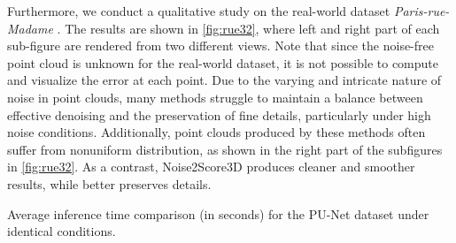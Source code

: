 Furthermore, we conduct a qualitative study on the real-world dataset \textit{Paris-rue-Madame} \cite{serna2014paris}. The results are shown in  \cref{fig:rue32}, where left and right part of each sub-figure are rendered from two different views. Note that since the noise-free point cloud is unknown for the real-world dataset, it is not possible to compute and visualize the error at each point. Due to the varying and intricate nature of noise in point clouds, many methods struggle to maintain a balance between effective denoising and the preservation of fine details, particularly under high noise conditions. Additionally, point clouds produced by these methods often suffer from nonuniform distribution, as shown in the right part of the 
subfigures in \cref{fig:rue32}. As a contrast, Noise2Score3D produces cleaner and smoother results, while better preserves details.


\begin{table}
    \begin{center}
    
    \end{center}
    \vspace{-0.05in}
    \caption{Average inference time comparison (in seconds) for the PU-Net \cite{yu2018PUNet} dataset under identical conditions.}
\end{table}

